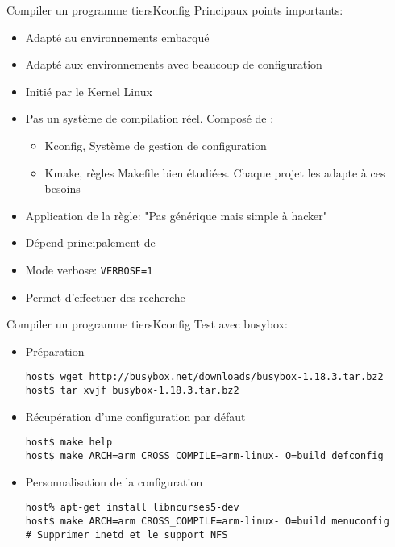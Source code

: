 \begin{frame}[fragile=singleslide]{Compiler un programme tiers}{Kconfig}
  Principaux points importants:
  \begin{itemize}
  \item Adapté au environnements embarqué
  \item Adapté aux environnements avec beaucoup de configuration
  \item Initié par le Kernel Linux
  \item  Pas un  système de  compilation réel. Composé de :
    \begin{itemize}
    \item Kconfig, Système de gestion de configuration
    \item  Kmake, règles  Makefile  bien étudiées.  Chaque projet  les
      adapte à ces besoins
    \end{itemize}
  \item Application de la règle: "Pas générique mais simple à hacker"
  \item Dépend principalement de 
  \item Mode verbose: \verb+VERBOSE=1+
  \item Permet d'effectuer des recherche
  \end{itemize}
\end{frame}

\begin{frame}[fragile=singleslide]{Compiler un programme tiers}{Kconfig}
  Test avec busybox:
  \begin{itemize}
  \item Préparation
\begin{lstlisting}
host$ wget http://busybox.net/downloads/busybox-1.18.3.tar.bz2
host$ tar xvjf busybox-1.18.3.tar.bz2
\end{lstlisting} %
  \item Récupération d'une configuration par défaut
\begin{lstlisting}
host$ make help
host$ make ARCH=arm CROSS_COMPILE=arm-linux- O=build defconfig
\end{lstlisting} %
  \item Personnalisation de la configuration
\begin{lstlisting}
host% apt-get install libncurses5-dev
host$ make ARCH=arm CROSS_COMPILE=arm-linux- O=build menuconfig
# Supprimer inetd et le support NFS
\end{lstlisting} %
  \end{itemize}
\end{frame}

